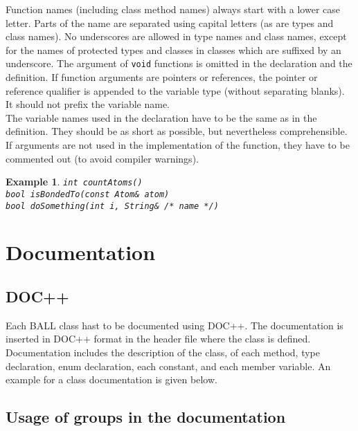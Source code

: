 \documentclass[a4]{article}
\newtheorem{example}{Example}
\begin{document}
Function names (including class method names) always start with a lower case
letter. Parts of the name are separated using capital letters (as are types
and class names). No underscores are allowed in type names and class names,
except for the names of protected types and classes in classes which are
suffixed by an underscore. The argument of {\tt void} functions is omitted in
the declaration and the definition. If function arguments are pointers or
references, the pointer or reference qualifier is appended to the variable
type (without separating blanks). It should not prefix the variable name.\\
The variable names used in the declaration have to be the same as in the
definition. They should be as short as possible, but nevertheless
comprehensible.  If arguments are not used in the implementation of the
function, they have to be commented out (to avoid compiler warnings).
\begin{example}
{\tt int countAtoms()}\\
{\tt bool isBondedTo(const Atom\& atom)}\\
{\tt bool doSomething(int i, String\& /* name */)}
\end{example}

\section{Documentation}

\subsection{DOC++}
Each BALL class hast to be documented using DOC++. The documentation is
inserted in DOC++ format in the header file where the class is defined.
Documentation includes the description of the class, of each method, type
declaration, enum declaration, each constant, and each member variable.
An example for a class documentation is given below. 

\subsection{Usage of groups in the documentation}
\end{document}
